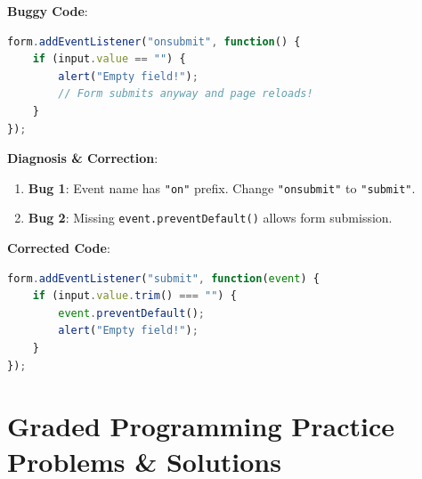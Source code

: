 \begin{debuggingbox}
\textbf{Buggy Code}:
\begin{lstlisting}[language=JavaScript]
form.addEventListener("onsubmit", function() {
    if (input.value == "") {
        alert("Empty field!");
        // Form submits anyway and page reloads!
    }
});
\end{lstlisting}
\textbf{Diagnosis \& Correction}:
\begin{enumerate}
    \item \textbf{Bug 1}: Event name has \texttt{"on"} prefix. Change \texttt{"onsubmit"} to \texttt{"submit"}.
    \item \textbf{Bug 2}: Missing \texttt{event.preventDefault()} allows form submission.
\end{enumerate}
\textbf{Corrected Code}:
\begin{lstlisting}[language=JavaScript]
form.addEventListener("submit", function(event) {
    if (input.value.trim() === "") {
        event.preventDefault();
        alert("Empty field!");
    }
});
\end{lstlisting}
\end{debuggingbox}

\section{Graded Programming Practice Problems \& Solutions}

